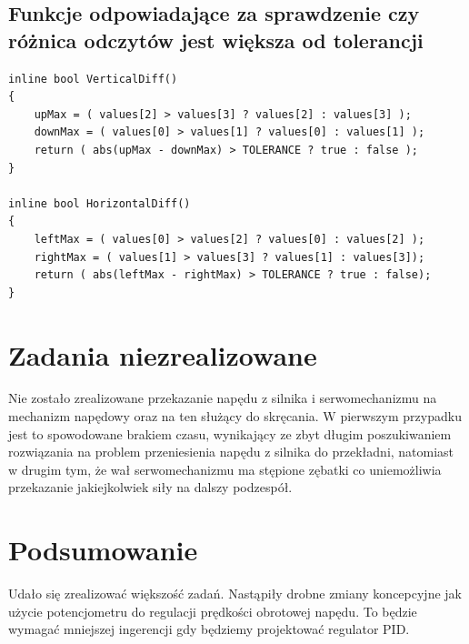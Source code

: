 \documentclass[10pt, a4paper]{article}
\begin{document}
\subsection{Funkcje odpowiadające za sprawdzenie czy różnica odczytów jest większa od tolerancji}
\begin{lstlisting}[tabsize=2]
inline bool VerticalDiff()
{
	upMax = ( values[2] > values[3] ? values[2] : values[3] );
	downMax = ( values[0] > values[1] ? values[0] : values[1] );
	return ( abs(upMax - downMax) > TOLERANCE ? true : false );
}

inline bool HorizontalDiff()
{
	leftMax = ( values[0] > values[2] ? values[0] : values[2] );
	rightMax = ( values[1] > values[3] ? values[1] : values[3]);
	return ( abs(leftMax - rightMax) > TOLERANCE ? true : false);
}
\end{lstlisting}

\section{Zadania niezrealizowane}
Nie zostało zrealizowane przekazanie napędu z silnika i serwomechanizmu na mechanizm napędowy oraz na ten służący do skręcania. W pierwszym przypadku jest to spowodowane brakiem czasu, wynikający ze zbyt długim poszukiwaniem rozwiązania na problem przeniesienia napędu z silnika do przekładni, natomiast w drugim tym, że wał serwomechanizmu ma stępione zębatki co uniemożliwia przekazanie jakiejkolwiek siły na dalszy podzespół.

\section{Podsumowanie}

Udało się zrealizować większość zadań. Nastąpiły drobne zmiany koncepcyjne jak użycie potencjometru do regulacji prędkości obrotowej napędu. To będzie wymagać mniejszej ingerencji gdy będziemy projektować regulator PID.

\newpage
{}


\end{document}
